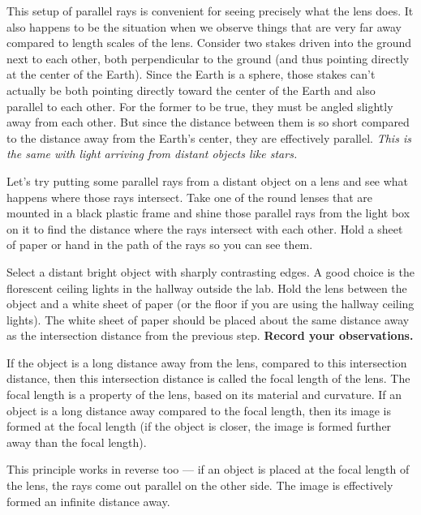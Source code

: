 This setup of parallel rays is convenient for seeing precisely what the lens does. It also happens to be the situation when we observe things that are very far away compared to length scales of the lens. Consider two stakes driven into the ground next to each other, both perpendicular to the ground (and thus pointing directly at the center of the Earth). Since the Earth is a sphere, those stakes can't actually be both pointing directly toward the center of the Earth and also parallel to each other. For the former to be true, they must be angled slightly away from each other. But since the distance between them is so short compared to the distance away from the Earth's center, they are effectively parallel. \textit{This is the same with light arriving from distant objects like stars.}

\begin{steps}
	\item Let's try putting some parallel rays from a distant object on a lens and see what happens where those rays intersect. Take one of the round lenses that are mounted in a black plastic frame and shine those parallel rays from the light box on it to find the distance where the rays intersect with each other. Hold a sheet of paper or hand in the path of the rays so you can see them.
	
	\item Select a distant bright object with sharply contrasting edges. A good choice is the florescent ceiling lights in the hallway outside the lab. Hold the lens between the object and a white sheet of paper (or the floor if you are using the hallway ceiling lights). The white sheet of paper should be placed about the same distance away as the intersection distance from the previous step. \textbf{Record your observations.}
\end{steps}

If the object is a long distance away from the lens, compared to this intersection distance, then this intersection distance is called the focal length of the lens. The focal length is a property of the lens, based on its material and curvature. If an object is a long distance away compared to the focal length, then its image is formed at the focal length (if the object is closer, the image is formed further away than the focal length).

This principle works in reverse too --- if an object is placed at the focal length of the lens, the rays come out parallel on the other side. The image is effectively formed an infinite distance away.

